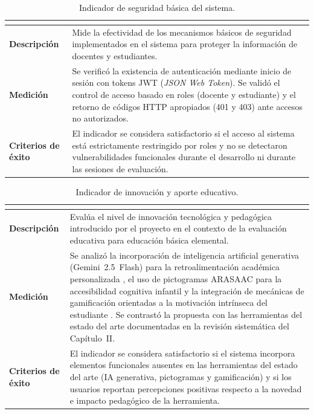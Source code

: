 \begin{table}[H]
\centering
\caption{Indicador de seguridad básica del sistema.}
\label{tab:ind_seg}
\footnotesize
\renewcommand{\arraystretch}{1.25}
\begin{tabularx}{\textwidth}{|>{\bfseries}p{3.2cm}|X|}
\hline
\rowcolor{headblue}\multicolumn{2}{|c|}{\textbf{Seguridad de acceso}}\\\hline
Descripción & Mide la efectividad de los mecanismos básicos de seguridad implementados en el sistema para proteger la información de docentes y estudiantes. \\\hline
Medición & Se verificó la existencia de autenticación mediante inicio de sesión con tokens JWT (\textit{JSON Web Token}). Se validó el control de acceso basado en roles (docente y estudiante) y el retorno de códigos HTTP apropiados (401 y 403) ante accesos no autorizados. \\\hline
Criterios de éxito & El indicador se considera satisfactorio si el acceso al sistema está estrictamente restringido por roles y no se detectaron vulnerabilidades funcionales durante el desarrollo ni durante las sesiones de evaluación. \\\hline
\end{tabularx}
\end{table}
\fuenteautor

\begin{table}[H]
\centering
\caption{Indicador de innovación y aporte educativo.}
\label{tab:ind_innov}
\footnotesize
\renewcommand{\arraystretch}{1.25}
\begin{tabularx}{\textwidth}{|>{\bfseries}p{3.2cm}|X|}
\hline
\rowcolor{headblue}\multicolumn{2}{|c|}{\textbf{Innovación educativa}}\\\hline
Descripción & Evalúa el nivel de innovación tecnológica y pedagógica introducido por el proyecto en el contexto de la evaluación educativa para educación básica elemental. \\\hline
Medición & Se analizó la incorporación de inteligencia artificial generativa (Gemini~2.5~Flash) para la retroalimentación académica personalizada \cite{maksimchuk2025genai,gonzalez2021ai}, el uso de pictogramas ARASAAC para la accesibilidad cognitiva infantil \cite{mayer2014multimedia,guillomia2021cognitive} y la integración de mecánicas de gamificación orientadas a la motivación intrínseca del estudiante \cite{debrenti2024gbl}. Se contrastó la propuesta con las herramientas del estado del arte documentadas en la revisión sistemática del Capítulo~II. \\\hline
Criterios de éxito & El indicador se considera satisfactorio si el sistema incorpora elementos funcionales ausentes en las herramientas del estado del arte (IA generativa, pictogramas y gamificación) y si los usuarios reportan percepciones positivas respecto a la novedad e impacto pedagógico de la herramienta. \\\hline
\end{tabularx}
\end{table}
\fuenteautor